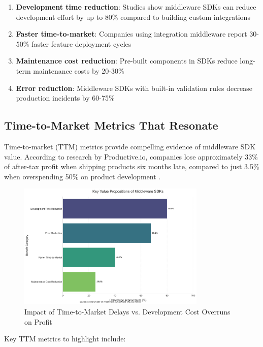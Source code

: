 \documentclass[11pt,a4paper]{article}
\begin{document}
\begin{enumerate}
    \item \textbf{Development time reduction}: Studies show middleware SDKs can reduce development effort by up to 80\% compared to building custom integrations \cite{prismatic2023}
    \item \textbf{Faster time-to-market}: Companies using integration middleware report 30-50\% faster feature deployment cycles \cite{aws2023}
    \item \textbf{Maintenance cost reduction}: Pre-built components in SDKs reduce long-term maintenance costs by 20-30\% \cite{haveignition2023}
    \item \textbf{Error reduction}: Middleware SDKs with built-in validation rules decrease production incidents by 60-75\% \cite{haveignition2023}
\end{enumerate}

\subsection{Time-to-Market Metrics That Resonate}

Time-to-market (TTM) metrics provide compelling evidence of middleware SDK value. According to research by Productive.io, companies lose approximately 33\% of after-tax profit when shipping products six months late, compared to just 3.5\% when overspending 50\% on product development \cite{productive2023}.

\begin{figure}[htbp]
    \centering
    \includegraphics[width=0.8\textwidth]{figures/visualization-20250510115610.png}
    \caption{Impact of Time-to-Market Delays vs. Development Cost Overruns on Profit}
    \label{fig:ttm-impact}
\end{figure}

Key TTM metrics to highlight include:
\end{document}
